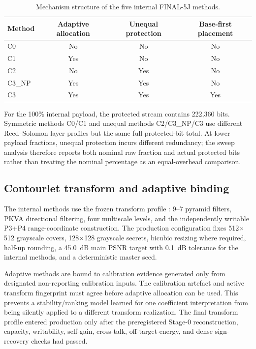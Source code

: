 \begin{table}[t]
\centering
\caption{Mechanism structure of the five internal FINAL-5J methods.}
\label{tab:internal-methods}
\begin{tabular}{lccc}
\toprule
Method & Adaptive allocation & Unequal protection & Base-first placement \\
\midrule
C0     & No  & No  & No \\
C1     & Yes & No  & No \\
C2     & No  & Yes & No \\
C3\_NP & Yes & Yes & No \\
C3     & Yes & Yes & Yes \\
\bottomrule
\end{tabular}
\end{table}

For the 100\% internal payload, the protected stream contains 222,360 bits. Symmetric methods C0/C1 and unequal methods C2/C3\_NP/C3 use different Reed--Solomon layer profiles but the same full protected-bit total. At lower payload fractions, unequal protection incurs different redundancy; the sweep analysis therefore reports both nominal raw fraction and actual protected bits rather than treating the nominal percentage as an equal-overhead comparison.

\subsection{Contourlet transform and adaptive binding}

The internal methods use the frozen transform profile : 9--7 pyramid filters, PKVA directional filtering, four multiscale levels, and the independently writable P3+P4 range-coordinate construction. The production configuration fixes 512$\times$512 grayscale covers, 128$\times$128 grayscale secrets, bicubic resizing where required, half-up rounding, a 45.0~dB main PSNR target with 0.1~dB tolerance for the internal methods, and a deterministic master seed.

Adaptive methods are bound to calibration evidence generated only from designated non-reporting calibration inputs. The calibration artefact and active transform fingerprint must agree before adaptive allocation can be used. This prevents a stability/ranking model learned for one coefficient interpretation from being silently applied to a different transform realization. The final transform profile entered production only after the preregistered Stage-0 reconstruction, capacity, writability, self-gain, cross-talk, off-target-energy, and dense sign-recovery checks had passed.

